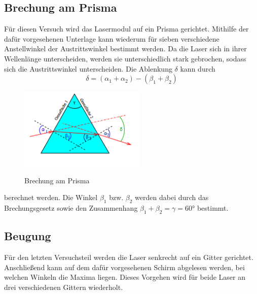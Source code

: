 \subsection{Brechung am Prisma}
Für diesen Versuch wird das Lasermodul auf ein Prisma gerichtet. Mithilfe der dafür vorgesehenen Unterlage kann wiederum für sieben verschiedene Anstellwinkel der Austrittswinkel bestimmt werden. Da die Laser sich in ihrer Wellenlänge unterscheiden, werden sie unterschiedlich stark gebrochen, sodass sich die Austrittswinkel unterscheiden.
Die Ablenkung $\delta$ kann durch
\begin{equation}
\delta=(\alpha_1 + \alpha_2)-(\beta_1 + \beta_2)
\end{equation}
\begin{figure} [h]
    \centering
    \includegraphics[width=6cm, keepaspectratio]{Brechung am Prisma}
    \label{fig:Prisma}
    \caption{Brechung am Prisma}
 \end{figure}
berechnet werden. Die Winkel $\beta_1$ bzw. $\beta_2$ werden dabei durch das Brechungsgesetz sowie den Zusammenhang $\beta_1+\beta_2=\gamma=60°$ bestimmt.
\subsection{Beugung}
Für den letzten Versuchsteil werden die Laser senkrecht auf ein Gitter gerichtet. Anschließend kann auf dem dafür vorgesehenen Schirm abgelesen werden, bei welchen Winkeln die Maxima liegen. Dieses Vorgehen wird für beide Laser an drei verschiedenen Gittern wiederholt. 
